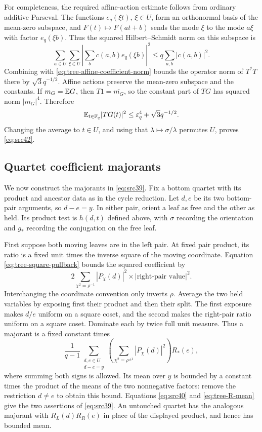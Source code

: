 For completeness, the required affine-action estimate follows from
ordinary additive Parseval.  The functions $e_q(\xi t)$,
$\xi\in U$, form an orthonormal basis of the mean-zero subspace, and
$F(t)\mapsto F(at+b)$ sends the mode $\xi$ to the mode $a\xi$ with
factor $e_q(\xi b)$.  Thus the squared Hilbert--Schmidt norm on this
subspace is
\[
 \sum_{a\in U}\sum_{\xi\in U}
       \left|\sum_b c(a,b)e_q(\xi b)\right|^2
 \leq q\sum_{a,b}|c(a,b)|^2.
\]
Combining with \eqref{eq:tree-affine-coefficient-norm} bounds the
operator norm of $T^*T$ there by $\sqrt3q^{-1/2}$.  Affine actions
preserve the mean-zero subspace and the constants.  If $m_G=\mathbb E G$,
then $T1=\overline{m_G}$, so the constant part of $TG$ has squared
norm $|m_G|^4$.  Therefore
\[
 \mathbb E_{t\in\mathbb F_q}|TG(t)|^2
 \leq\varepsilon_q^4+\sqrt3q^{-1/2}.
\]
Changing the average to $t\in U$, and using that
$\lambda\mapsto\sigma/\lambda$ permutes $U$, proves
\eqref{eq:src42}.

\subsection{Quartet coefficient majorants}

We now construct the majorants in \eqref{eq:src39}. Fix a bottom
quartet with its product and ancestor data as in the cycle reduction.
Let $d,e$ be its two bottom-pair arguments, so $d-e=y$. In either pair,
orient a leaf as free and the other as held.  Its product test is
$h(d,t)$ defined above, with $\sigma$ recording the
orientation and $g_*$ recording the conjugation on the free leaf.

First suppose both moving leaves are in the left pair.  At fixed pair
product, its ratio is a fixed unit times the inverse square of the moving
coordinate.  Equation \eqref{eq:tree-square-pullback} bounds the squared
coefficient by
\[
 2\sum_{\chi^2=\rho^{-1}}|P_\chi(d)|^2
                         \times|\text{right-pair value}|^2.
\]
Interchanging the coordinate convention only inverts $\rho$.
Average the two held variables by exposing first their product and
then their split.  The first exposure makes $d/e$ uniform on a square
coset, and the second makes the right-pair ratio uniform on a square
coset.  Dominate each by twice full unit measure.  Thus a majorant is
a fixed constant times
\begin{equation}\label{eq:tree-same-pair-majorant}
 \frac1{q-1}\sum_{\substack{d,e\in U\\d-e=y}}
       \left(\sum_{\chi^2=\rho^{\pm1}}|P_\chi(d)|^2\right)R_*(e),
\end{equation}
where summing both signs is allowed.  Its mean over $y$ is bounded by
a constant times the product of the means of the two nonnegative
factors: remove the restriction $d\ne e$ to obtain this bound.
Equations \eqref{eq:src40} and \eqref{eq:tree-R-mean} give the two
assertions of \eqref{eq:src39}.  An untouched quartet has the analogous
majorant with $R_L(d)R_R(e)$ in place of the displayed product, and
hence has bounded mean.

